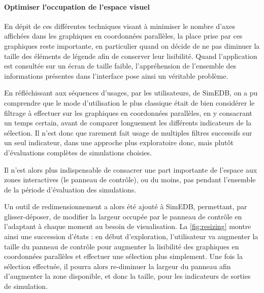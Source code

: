 \paragraph*{Optimiser l'occupation de l'espace visuel}

En dépit de ces différentes techniques visant à minimiser le nombre d'axes affichées dans les graphiques en coordonnées parallèles, la place prise par ces graphiques reste importante, en particulier quand on décide de ne pas diminuer la taille des éléments de légende afin de conserver leur lisibilité.
Quand l'application est consultée sur un écran de taille faible, l'appréhension de l'ensemble des informations présentes dans l'interface pose ainsi un véritable problème.

En réfléchissant aux séquences d'usages, par les utilisateurs, de SimEDB, on a pu comprendre que le mode d'utilisation le plus classique était de bien considérer le filtrage à effectuer sur les graphiques en coordonnées parallèles, en y consacrant un temps certain, avant de comparer longuement les différents indicateurs de la sélection.
Il n'est donc que rarement fait usage de multiples filtres successifs sur un seul indicateur, dans une approche plus exploratoire donc, mais plutôt d'évaluations complètes de simulations choisies.

Il n'est alors plus indispensable de consacrer une part importante de l'espace aux zones interactives (le panneau de contrôle), ou du moins, pas pendant l'ensemble de la période d'évaluation des simulations.

Un outil de redimensionnement a alors été ajouté à SimEDB, permettant, par glisser-déposer, de modifier la largeur occupée par le panneau de contrôle en l'adaptant à chaque moment au besoin de visualisation.
La \cref{fig:resizing} montre ainsi une succession d'états : en début d'exploration, l'utilisateur va augmenter la taille du panneau de contrôle pour augmenter la lisibilité des graphiques en coordonnées parallèles et effectuer une sélection plus simplement.
Une fois la sélection effectuée, il pourra alors re-diminuer la largeur du panneau afin d'augmenter la zone disponible, et donc la taille, pour les indicateurs de sorties de simulation. 

